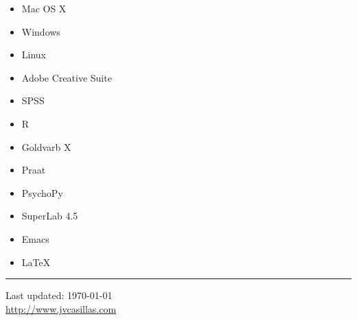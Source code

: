 \documentclass[11pt]{article}
\begin{document}
\begin{multicols}{3}
  \begin{itemize}
  \item Mac OS X \vspace{-0.1in}
  \item Windows \vspace{-0.1in}
  \item Linux \vspace{-0.1in}
  \item Adobe Creative Suite

  \item SPSS \vspace{-0.1in}
  \item R \vspace{-0.1in}
  \item Goldvarb X \vspace{-0.1in}
  \item Praat 

  \item PsychoPy \vspace{-0.1in}
  \item SuperLab 4.5 \vspace{-0.1in}
  \item Emacs \vspace{-0.1in}
  \item \LaTeX
  \end{itemize}
\end{multicols}

\vspace{-0.1in}

\noindent \rule{390pt}{.5 mm}

\smallskip

\begin{center}
  \begin{footnotesize}
    Last updated: \today \\
    \href{http://www.jvcasillas.com}{http://www.jvcasillas.com}
  \end{footnotesize}
\end{center}


\end{document}
